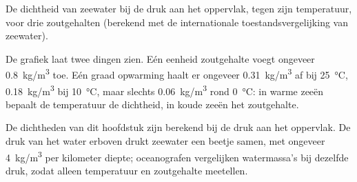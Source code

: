 \begin{omfigure}

{\small De dichtheid van zeewater bij de druk aan het oppervlak, tegen zijn
temperatuur, voor drie zoutgehalten (berekend met de internationale
toestandsvergelijking van zeewater).}
\end{omfigure}

De grafiek laat twee dingen zien. Eén eenheid zoutgehalte voegt ongeveer
\qty{0.8}{kg/m^3} toe. Eén graad opwarming haalt er ongeveer \qty{0.31}{kg/m^3}
af bij \qty{25}{\degreeCelsius}, \qty{0.18}{kg/m^3} bij \qty{10}{\degreeCelsius},
maar slechts \qty{0.06}{kg/m^3} rond \qty{0}{\degreeCelsius}: in warme zeeën
bepaalt de temperatuur de dichtheid, in koude zeeën het zoutgehalte.

\begin{remark}
De dichtheden van dit hoofdstuk zijn berekend bij de druk aan het oppervlak. De
druk van het water erboven drukt zeewater een beetje samen, met ongeveer
\qty{4}{kg/m^3} per kilometer diepte; oceanografen vergelijken watermassa's bij
dezelfde druk, zodat alleen temperatuur en zoutgehalte meetellen.
\end{remark}


